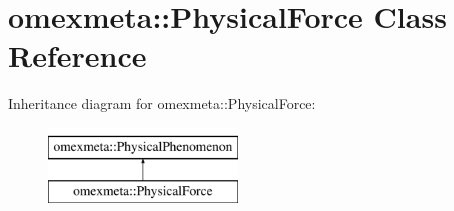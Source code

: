 \hypertarget{classomexmeta_1_1PhysicalForce}{}\section{omexmeta\+:\+:Physical\+Force Class Reference}
\label{classomexmeta_1_1PhysicalForce}
Inheritance diagram for omexmeta\+:\+:Physical\+Force\+:\begin{figure}[H]
\begin{center}
\leavevmode
\includegraphics[height=2.000000cm]{classomexmeta_1_1PhysicalForce}
\end{center}
\end{figure}
